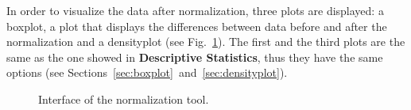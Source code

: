 \documentclass[12pt]{article}
\begin{document}
In order to visualize the data after normalization, three plots are displayed: a boxplot, a plot that displays the differences between data before and after the normalization and a densityplot (see Fig.~\ref{fig:norma}). The first and the third plots are the same as the one showed in \textbf{Descriptive Statistics}, thus they have the same options (see Sections~\ref{sec:boxplot}~and~\ref{sec:densityplot}).

\begin {figure}
\centering
{}
\caption{Interface of the normalization tool.}\label{fig:norma}
\end {figure}
\end{document}
